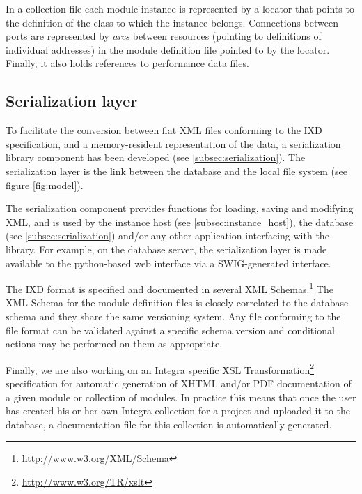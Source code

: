 In a collection file each module instance is represented by a locator that points to the definition of the class to which the instance belongs. Connections between ports are represented by \emph{arcs} between resources (pointing to definitions of individual addresses) in the module definition file pointed to by the locator. Finally, it also holds references to performance data files.


\subsection{Serialization layer}\label{sec:serialization_layer}

To facilitate the conversion between flat XML files conforming to the IXD specification, and a memory-resident representation of the data, a serialization library component has been developed (see \ref{subsec:serialization}). The serialization layer is the link  between the database and the local file system (see figure \ref{fig:model}).

The serialization component provides functions for loading, saving and modifying XML, and is used by the instance host (see \ref{subsec:instance_host}), the database (see \ref{subsec:serialization}) and/or any other application interfacing with the library. For example, on the database server, the serialization layer is made available to the python-based web interface via a SWIG-generated interface.

The IXD format is specified and documented in several XML Schemas.\footnote{\url{http://www.w3.org/XML/Schema}} The XML Schema for the module definition files is closely correlated to the database schema and they share the same versioning system. Any file conforming to the file format can be validated against a specific schema version and conditional actions may be performed on them as appropriate.

Finally, we are also working on an Integra specific XSL Transformation\footnote{\url{http://www.w3.org/TR/xslt}} specification for automatic generation of XHTML and/or PDF documentation of a given module or collection of modules. In practice this means that once the user has created his or her own Integra collection for a project and uploaded it to the database, a documentation file for this collection is automatically generated.



